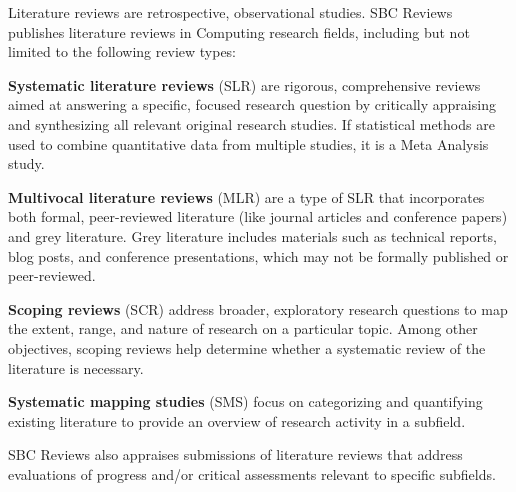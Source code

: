 \documentclass[english]{sbcreviews-2025}%
\begin{document}
Literature reviews are retrospective, observational studies.
SBC Reviews publishes literature reviews in Computing research fields, including but not limited to the following review types:

\textbf{Systematic literature reviews} (SLR) are rigorous, comprehensive reviews aimed at answering a specific, focused research question by critically appraising and synthesizing all relevant original research studies. If statistical methods are used to combine quantitative data from  multiple studies, it is a Meta Analysis study.

\textbf{Multivocal literature reviews} (MLR) are a type of SLR that incorporates both formal, peer-reviewed literature (like journal articles and conference papers) and grey literature. Grey literature includes materials such as technical reports, blog posts, and conference presentations, which may not be formally published or peer-reviewed.

\textbf{Scoping reviews} (SCR) address broader, exploratory research questions to map the extent, range, and nature of research on a particular topic. Among other objectives, scoping reviews help determine whether a systematic review of the literature is necessary.

\textbf{Systematic mapping studies} (SMS) focus on categorizing and quantifying existing literature to provide an overview of research activity in a subfield.

SBC Reviews also appraises submissions of literature reviews that address evaluations of progress and/or critical assessments relevant to specific subfields.



\end{document}
